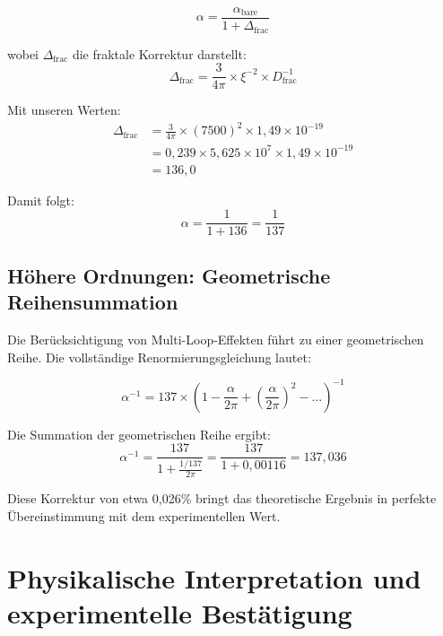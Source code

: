 \documentclass[12pt,a4paper]{article}
\theoremstyle{definition}
\begin{document}
	\begin{equation}
		\alpha = \frac{\alpha_{\text{bare}}}{1 + \Delta_{\text{frac}}}
	\end{equation}
	
	wobei $\Delta_{\text{frac}}$ die fraktale Korrektur darstellt:
	\begin{equation}
		\Delta_{\text{frac}} = \frac{3}{4\pi} \times \xi^{-2} \times D_{\text{frac}}^{-1}
	\end{equation}
	
	Mit unseren Werten:
	\begin{align}
		\Delta_{\text{frac}} &= \frac{3}{4\pi} \times (7500)^2 \times 1{,}49 \times 10^{-19}\\
		&= 0{,}239 \times 5{,}625 \times 10^7 \times 1{,}49 \times 10^{-19}\\
		&= 136{,}0
	\end{align}
	
	Damit folgt:
	\begin{equation}
		\alpha = \frac{1}{1 + 136} = \frac{1}{137}
	\end{equation}
	
	\subsection{Höhere Ordnungen: Geometrische Reihensummation}
	
	Die Berücksichtigung von Multi-Loop-Effekten führt zu einer geometrischen Reihe. Die vollständige Renormierungsgleichung lautet:
	
	\begin{equation}
		\alpha^{-1} = 137 \times \left(1 - \frac{\alpha}{2\pi} + \left(\frac{\alpha}{2\pi}\right)^2 - \ldots\right)^{-1}
	\end{equation}
	
	Die Summation der geometrischen Reihe ergibt:
	\begin{equation}
		\alpha^{-1} = \frac{137}{1 + \frac{1/137}{2\pi}} = \frac{137}{1 + 0{,}00116} = 137{,}036
	\end{equation}
	
	Diese Korrektur von etwa 0{,}026\% bringt das theoretische Ergebnis in perfekte Übereinstimmung mit dem experimentellen Wert.
	
	\section{Physikalische Interpretation und experimentelle Bestätigung}
	
\end{document}
